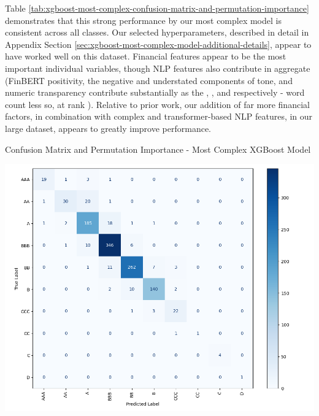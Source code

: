 \documentclass{article}[11pt]
\begin{document}
    Table \ref{tab:xgboost-most-complex-confusion-matrix-and-permutation-importance} demonstrates that this strong performance by our most complex model is consistent across all classes. Our selected hyperparameters, described in detail in Appendix Section \ref{sec:xgboost-most-complex-model-additional-details}, appear to have worked well on this dataset. Financial features appear to be the most important individual variables, though NLP features also contribute in aggregate (FinBERT positivity, the negative and understated components of tone, and numeric transparency contribute substantially as the \rPosScoreFinbert, \rNeg, and \rUndrst \space respectively - word count less so, at rank \rWordCount). Relative to prior work, our addition of far more financial factors, in combination with complex and transformer-based NLP features, in our large dataset, appears to greatly improve performance.

    \begin{table}[h!]
        \centering
        \caption{Confusion Matrix and Permutation Importance - Most Complex XGBoost Model}
        \begin{minipage}[c]{0.45\linewidth}
            \centering
            \includegraphics[width=0.95\hsize]{../Output/Modelling/XGBoost/exclude_previous_rating_model_3/exclude_previous_rating_model_3_confusion_matrix_no_title.png}
        \end{minipage}
        \begin{minipage}[c]{0.45\linewidth}
            \centering
            
        \end{minipage}
        \label{tab:xgboost-most-complex-confusion-matrix-and-permutation-importance}
    \end{table}
\end{document}
